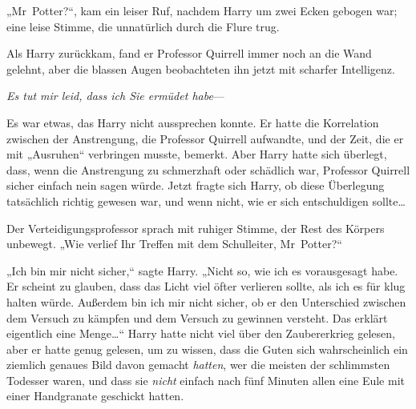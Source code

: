 „Mr~Potter?“, kam ein leiser Ruf, nachdem Harry um zwei Ecken gebogen war; eine leise Stimme, die unnatürlich durch die Flure trug.

Als Harry zurückkam, fand er Professor Quirrell immer noch an die Wand gelehnt, aber die blassen Augen beobachteten ihn jetzt mit scharfer Intelligenz.

\emph{Es tut mir leid, dass ich Sie ermüdet habe}—

Es war etwas, das Harry nicht aussprechen konnte. Er hatte die Korrelation zwischen der Anstrengung, die Professor Quirrell aufwandte, und der Zeit, die er mit „Ausruhen“ verbringen musste, bemerkt. Aber Harry hatte sich überlegt, dass, wenn die Anstrengung zu schmerzhaft oder schädlich war, Professor Quirrell sicher einfach nein sagen würde. Jetzt fragte sich Harry, ob diese Überlegung tatsächlich richtig gewesen war, und wenn nicht, wie er sich entschuldigen sollte…

Der Verteidigungsprofessor sprach mit ruhiger Stimme, der Rest des Körpers unbewegt. „Wie verlief Ihr Treffen mit dem Schulleiter, Mr~Potter?“

„Ich bin mir nicht sicher,“ sagte Harry. „Nicht so, wie ich es vorausgesagt habe. Er scheint zu glauben, dass das Licht viel öfter verlieren sollte, als ich es für klug halten würde. Außerdem bin ich mir nicht sicher, ob er den Unterschied zwischen dem Versuch zu kämpfen und dem Versuch zu gewinnen versteht. Das erklärt eigentlich eine Menge…“ Harry hatte nicht viel über den Zaubererkrieg gelesen, aber er hatte genug gelesen, um zu wissen, dass die Guten sich wahrscheinlich ein ziemlich genaues Bild davon gemacht \emph{hatten}, wer die meisten der schlimmsten Todesser waren, und dass sie \emph{nicht} einfach nach fünf Minuten allen eine Eule mit einer Handgranate geschickt hatten.

